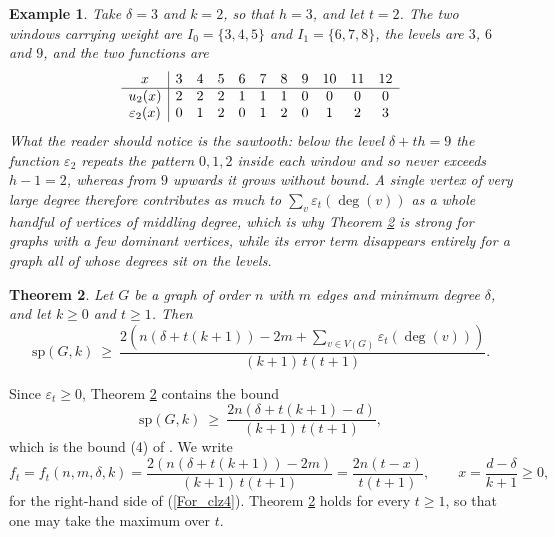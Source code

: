\documentclass[10pt,a4paper]{article}
\newtheorem{theorem}{Theorem}
\newtheorem{example}[theorem]{Example}
\begin{document}
\begin{example}
\label{Ex_eps}Take $\delta =3$ and $k=2$, so that $h=3$, and let $t=2$. The two
windows carrying weight are $I_{0}=\{3,4,5\}$ and $I_{1}=\{6,7,8\}$, the levels
are $3$, $6$ and $9$, and the two functions are
\[
\begin{array}
[c]{c|cccccccccc}%
x & 3 & 4 & 5 & 6 & 7 & 8 & 9 & 10 & 11 & 12\\\hline
u_{2}(x) & 2 & 2 & 2 & 1 & 1 & 1 & 0 & 0 & 0 & 0\\
\varepsilon _{2}(x) & 0 & 1 & 2 & 0 & 1 & 2 & 0 & 1 & 2 & 3
\end{array}
\]
What the reader should notice is the sawtooth: below the level $\delta +th=9$
the function $\varepsilon _{2}$ repeats the pattern $0,1,2$ inside each window
and so never exceeds $h-1=2$, whereas from $9$ upwards it grows without bound.
A single vertex of very large degree therefore contributes as much to
$\sum_{v}\varepsilon _{t}(\deg (v))$ as a whole handful of vertices of middling
degree, which is why Theorem \ref{Tm_gen} is strong for graphs with a few
dominant vertices, while its error term disappears entirely for a graph all of
whose degrees sit on the levels.
\end{example}



\begin{theorem}
\label{Tm_gen}Let $G$ be a graph of order $n$ with $m$ edges and minimum degree $\delta $, and let
$k\geq 0$ and $t\geq 1$. Then
\[
\mathrm{sp}(G,k)\ \geq \ \frac{2\left( n\left( \delta +t(k+1)\right) -2m+\sum_{v\in V(G)}%
\varepsilon _{t}(\deg (v))\right) }{(k+1)\,t(t+1)} .
\]
\end{theorem}

Since $\varepsilon _{t}\geq 0$, Theorem \ref{Tm_gen} contains the bound
\begin{equation}
\mathrm{sp}(G,k)\ \geq \ \frac{2n\left( \delta +t(k+1)-d\right) }{(k+1)\,t(t+1)},
\label{For_clz4}%
\end{equation}
which is the bound (4) of \cite{CaroLauriZarb}. We write
\[
f_{t}=f_{t}(n,m,\delta ,k)=\frac{2\left( n(\delta +t(k+1))-2m\right) }{(k+1)\,t(t+1)}=\frac{2n(t-x)}%
{t(t+1)},\qquad x=\frac{d-\delta }{k+1}\geq 0,
\]
for the right-hand side of (\ref{For_clz4}). Theorem \ref{Tm_gen} holds for every $t\geq 1$, so that one may take
the maximum over $t$.
\end{document}
